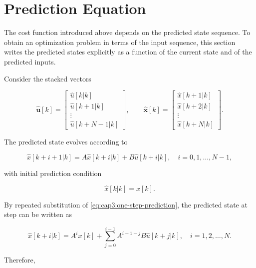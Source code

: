 \section{Prediction Equation}

The cost function introduced above depends on the predicted state sequence. To obtain an optimization problem in terms of the input sequence, this section writes the predicted states explicitly as a function of the current state and of the predicted inputs.

Consider the stacked vectors

\begin{equation}
	\mathbf{\hat{u}}[k] = \left[
		\begin{matrix}
			\hat{u}[k | k] \\
			\hat{u}[k + 1 | k] \\
			\vdots \\
			\hat{u}[k + N-1 | k]
		\end{matrix}
	\right],
	\qquad
	\mathbf{\hat{x}}[k] =
	\left[
		\begin{matrix}
			\hat{x}[k + 1 | k] \\
			\hat{x}[k + 2 | k] \\
			\vdots \\
			\hat{x}[k + N | k]
		\end{matrix}
	\right].
\end{equation}

\noindent
The predicted state evolves according to

\noindent
\begin{equation}
	\label{eq:cap3:one-step-prediction}
	\hat{x}[k + i + 1 | k] = A\hat{x}[k+i | k] + B \hat{u}[k+i | k],
	\quad i = 0, 1, \ldots, N-1,
\end{equation}

\noindent
with initial prediction condition

\noindent
\begin{equation}
	\hat{x}[k|k] = x[k].
\end{equation}

By repeated substitution of \eqref{eq:cap3:one-step-prediction}, the predicted state at step  can be written as

\begin{equation}
	\hat{x}[k+i|k] = A^i x[k] + \sum_{j=0}^{i-1} A^{i - 1 -j} B \hat{u}[k+j|k],
	\quad i = 1,2,\ldots,N.
\end{equation}

\noindent
Therefore,

